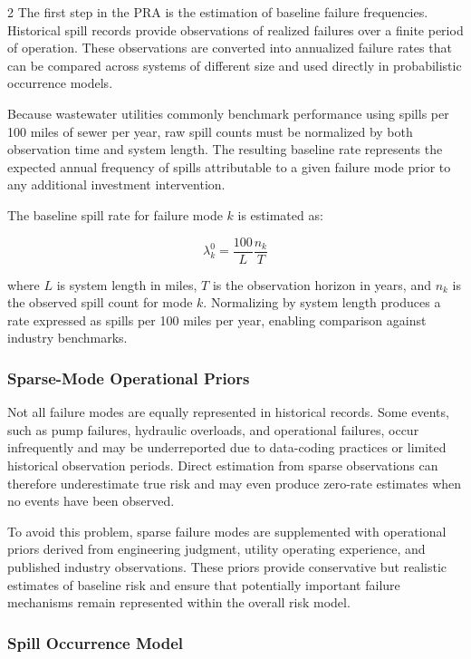 \documentclass[10pt]{article}
\begin{document}
\begin{multicols}{2}
The first step in the PRA is the estimation of baseline failure frequencies. Historical spill records provide observations of realized failures over a finite period of operation. These observations are converted into annualized failure rates that can be compared across systems of different size and used directly in probabilistic occurrence models.

Because wastewater utilities commonly benchmark performance using spills per 100 miles of sewer per year, raw spill counts must be normalized by both observation time and system length. The resulting baseline rate represents the expected annual frequency of spills attributable to a given failure mode prior to any additional investment intervention.

The baseline spill rate for failure mode $k$ is estimated as:

\[
\lambda_k^0
=
\frac{100}{L}\frac{n_k}{T}
\]

where $L$ is system length in miles, $T$ is the observation horizon in years,
and $n_k$ is the observed spill count for mode $k$. Normalizing by system
length produces a rate expressed as spills per 100 miles per year, enabling
comparison against industry benchmarks.

\subsubsection{Sparse-Mode Operational Priors}

Not all failure modes are equally represented in historical records. Some events, such as pump failures, hydraulic overloads, and operational failures, occur infrequently and may be underreported due to data-coding practices or limited historical observation periods. Direct estimation from sparse observations can therefore underestimate true risk and may even produce zero-rate estimates when no events have been observed.

To avoid this problem, sparse failure modes are supplemented with operational priors derived from engineering judgment, utility operating experience, and published industry observations. These priors provide conservative but realistic estimates of baseline risk and ensure that potentially important failure mechanisms remain represented within the overall risk model.

\subsubsection{Spill Occurrence Model}


\end{multicols}
\end{document}
